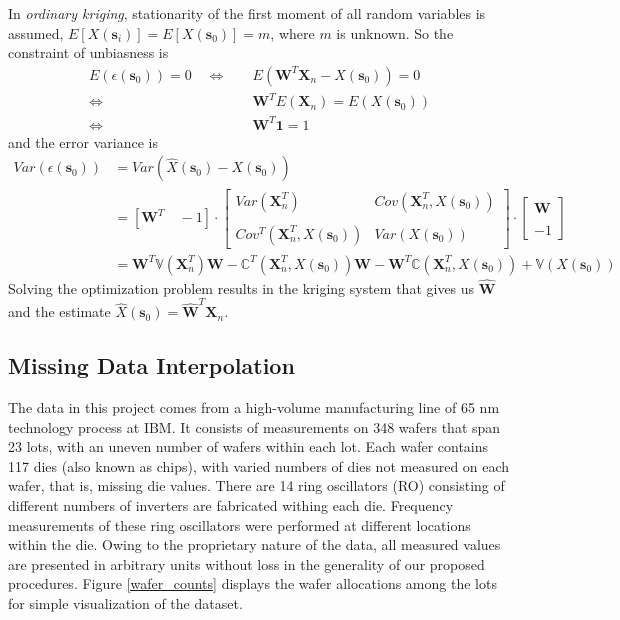 \documentclass[english]{article}
\numberwithin{equation}{section}
\numberwithin{table}{section}
\numberwithin{figure}{section}
\newcommand{\bms}{\bm{s}}
\begin{document}
In \emph{ordinary kriging}, stationarity of the first moment of
all random variables is assumed, $ E[X(\bms_i)] = E[X(\bms_0)] = m$,
where $m$ is unknown. So the constraint of unbiasness is 
\begin{equation} \label{unbias}
\begin{split}
  E(\epsilon(\bms_0)) = 0 \quad 
  \Leftrightarrow \quad &E(\bm{W}^T\bm{X}_n - X(\bms_0)) = 0 \\
  \Leftrightarrow \quad &\bm{W}^TE(\bm{X}_n) = E(X(\bms_0)) \\
  \Leftrightarrow \quad &\bm{W}^T\bm{1} = 1
\end{split}
\end{equation}
and the error variance is
\begin{equation} \label{varerr}
\begin{split}
  Var(\epsilon(\bms_0)) &= Var(\hat{X}(\bms_0) - X(\bms_0)) \\
  &=[\bm{W}^T \quad -1] \cdot 
  \begin{bmatrix}
    Var(\bm{X}_n^T) &  Cov(\bm{X}_n^T,  X(\bms_0))\\
    \\
    Cov^T(\bm{X}_n^T,  X(\bms_0)) & Var(X(\bms_0))
  \end{bmatrix}
  \cdot \begin{bmatrix}
    \bm{W} \\
    \\
    -1
  \end{bmatrix} \\
 &=\bm{W}^T\mathbb{V}(\bm{X}_n^T)\bm{W} - \mathbb{C}^T(\bm{X}_n^T, X(\bms_0))\bm{W}
  - \bm{W}^T\mathbb{C}(\bm{X}_n^T, X(\bms_0)) + \mathbb{V}(X(\bms_0))
\end{split}
\end{equation}
Solving the optimization problem results in the kriging system that
gives us $\hat{\bm{W}}$ and the estimate $\hat{X}(\bms_0)=\hat{\bm{W}}^T\bm{X}_n$.


\subsection{Missing Data Interpolation} \label{nafit}

\hspace{12 pt}
The data in this project comes from a high-volume manufacturing line
of 65 nm technology process at IBM. It consists of measurements on 348
wafers that span 23 lots, with an uneven number of wafers within each
lot. Each wafer contains 117 dies (also known as chips), with varied
numbers of dies not measured on each wafer, that is, missing die
values. There are 14 ring oscillators (RO) consisting of different numbers
of inverters are fabricated withing each die. Frequency measurements
of these ring oscillators were performed
at different locations within the die. Owing to the proprietary nature
of the data, all measured values are presented in arbitrary units
without loss in the generality of our proposed procedures. 
Figure \ref{wafer_counts} displays the wafer allocations among the
lots for simple visualization of the dataset. 
\end{document}
